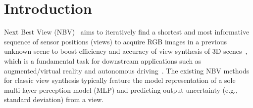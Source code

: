 \section{Introduction}

Next Best View (NBV)~\cite{1087372,Biss_NBV,guedon_scone_2022,jin_neu-nbv_2023} aims to iteratively find a shortest and most informative sequence of sensor positions (views) to acquire RGB images in a previous unknown scene to boost efficiency and accuracy of view synthesis of 3D scenes~\cite{sun_direct_2022,li_bnv-fusion_2022,jin_neu-nbv_2023}, which is a fundamental task for downstream applications such as augmented/virtual reality and autonomous driving~\cite{chen_active_2011}.
The existing NBV methods~\cite{shen_stochastic_2021,jin_neu-nbv_2023,ran_neurar_2023} for classic view synthesis typically feature the model representation of a sole multi-layer perception model (MLP) and predicting output uncertainty (e.g., standard deviation) from a view.


